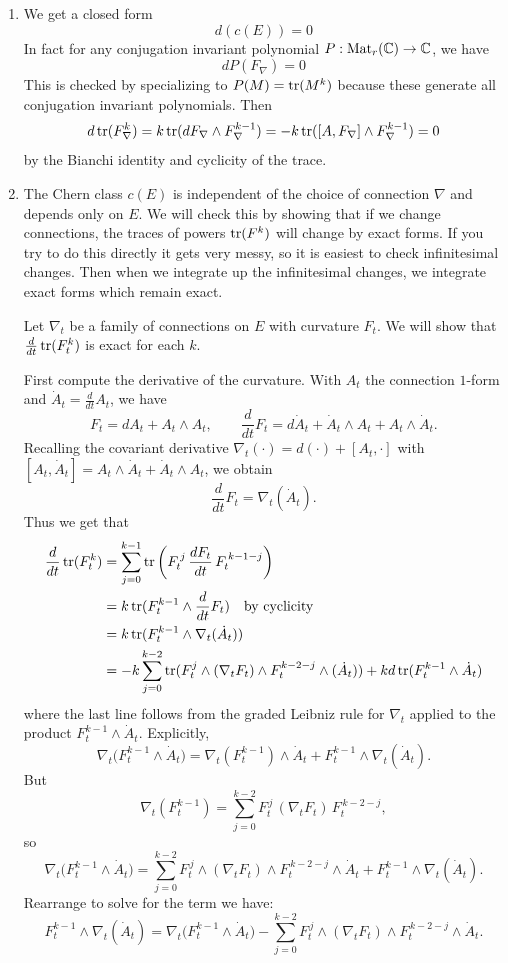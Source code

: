 \documentclass[12pt]{article}
\begin{document}
\begin{enumerate}
    \item We get a closed form \[
    d(c(E)) = 0
    \] In fact for any conjugation invariant polynomial $P:\operatorname{Mat}_r(\mathbb{C}) \to \mathbb{C}$, we have \[
        dP(F_\nabla) = 0
    \] This is checked by specializing to $P(M) = \operatorname{tr}(M^k)$ because these generate all conjugation invariant polynomials. Then \[
        d\operatorname{tr}(F_\nabla^k) = k \operatorname{tr}(dF_\nabla \wedge F_\nabla^{k-1}) = -k \operatorname{tr}([A, F_\nabla] \wedge F_\nabla^{k-1}) = 0
    \] by the Bianchi identity and cyclicity of the trace.
    \item The Chern class $c(E)$ is independent of the choice of connection $\nabla$ and depends only on $E$. We will check this by showing that if we change connections, the traces of powers $\operatorname{tr}(F^k)$ will change by exact forms. If you try to do this directly it gets very messy, so it is easiest to check infinitesimal changes. Then when we integrate up the infinitesimal changes, we integrate exact forms which remain exact.
    
    Let $\nabla_t$ be a family of connections on $E$ with curvature $F_t$. We will show that $\frac{d}{dt} \operatorname{tr}(F_t^k)$ is exact for each $k$.
    
    First compute the derivative of the curvature. With $A_t$ the connection $1$-form and $\dot A_t=\frac{d}{dt}A_t$, we have
    \[
    F_t=dA_t + A_t\wedge A_t,
    \qquad
    \frac{d}{dt}F_t = d\dot A_t + \dot A_t\wedge A_t + A_t\wedge\dot A_t.
    \]
    Recalling the covariant derivative $\nabla_t(\cdot)=d(\cdot)+[A_t,\cdot]$ with $[A_t,\dot A_t]=A_t\wedge\dot A_t+\dot A_t\wedge A_t$, we obtain
    \[
    \frac{d}{dt}F_t=\nabla_t(\dot A_t).
    \]
    Thus we get that \begin{align*}
\frac{d}{dt}\operatorname{tr}(F_t^k)
&= \sum_{j=0}^{k-1}
\operatorname{tr}\left(
F_t^{\,j}\,\frac{dF_t}{dt}\,F_t^{\,k-1-j}
\right) \\ 
        & = k \operatorname{tr}(F_t^{k-1} \wedge \frac{d}{dt} F_t) \text{\quad by cyclicity} \\
        & = k \operatorname{tr}(F_t^{k-1} \wedge \nabla_t (\dot A_t))  \\
        & = -k \sum_{j=0}^{k-2} \operatorname{tr}(F_t^j \wedge (\nabla_t F_t) \wedge F_t^{k-2-j} \wedge (\dot A_t)) + k d \operatorname{tr}(F_t^{k-1} \wedge \dot A_t)
    \end{align*}
where the last line follows from the graded Leibniz rule for $\nabla_t$ applied to the product $F_t^{k-1} \wedge \dot A_t$. Explicitly, \[
\nabla_t\bigl(F_t^{k-1}\wedge \dot A_t\bigr)
= \nabla_t(F_t^{k-1})\wedge \dot A_t
+ F_t^{k-1}\wedge \nabla_t(\dot A_t).
\]
But
\[
\nabla_t(F_t^{k-1})
= \sum_{j=0}^{k-2}
F_t^{\,j}\,(\nabla_t F_t)\,F_t^{\,k-2-j},
\]
so
\[
\nabla_t\bigl(F_t^{k-1}\wedge\dot A_t\bigr)
=
\sum_{j=0}^{k-2}
F_t^{\,j}\wedge(\nabla_t F_t)\wedge F_t^{\,k-2-j}\wedge\dot A_t
+ F_t^{k-1}\wedge\nabla_t(\dot A_t).
\]
Rearrange to solve for the term we have:
\[
F_t^{k-1}\wedge\nabla_t(\dot A_t)
=
\nabla_t\bigl(F_t^{k-1}\wedge\dot A_t\bigr)
- \sum_{j=0}^{k-2}
F_t^{\,j}\wedge(\nabla_t F_t)\wedge F_t^{\,k-2-j}\wedge\dot A_t.
\]
    

\end{enumerate}
\end{document}
